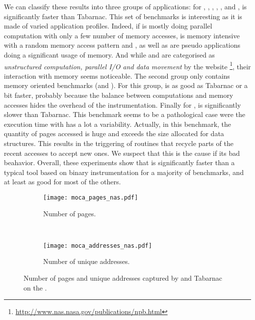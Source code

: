 We can classify these results into three groups of
applications:  for \BT, \DC, \EP, \IS, \LU, \SP and \UA, \Moca is
significantly faster than Tabarnac. This set of benchmarks is interesting as it is made of varied application profiles.
Indeed, if \EP is mostly doing parallel computation with only a few number of
memory accesses, \IS is memory intensive with a random memory access pattern and
\BT, \LU as well as \SP are pseudo applications doing a significant usage of memory.
And while \DC and \UA are categorised as \emph{unstructured computation,
parallel I/O and data movement} by the \NPB website
\footnote{\url{http://www.nas.nasa.gov/publications/npb.html}}, their interaction with memory seems noticeable.
The second group only contains memory oriented benchmarks (\CG and \FT). For this group,
\Moca is as good as Tabarnac or a bit faster, probably because the balance between computations and memory accesses hides the overhead of the instrumentation.
Finally for \MG, \Moca is
significantly slower than Tabarnac. This benchmark seems to be a pathological
case were the execution time with \Moca has a lot a variability. Actually, in this benchmark, the quantity of pages accessed is huge and exceeds the size
allocated for \Moca data structures. This results in the triggering of \Moca routines that recycle parts of the recent accesses to accept new ones.
We suspect that this is the cause if its bad beahavior.
Overall, these experiments show that \Moca is significantly faster than a typical tool based on binary instrumentation
for a majority of benchmarks, and at least as good for most of the others.

\begin{figure*}[htb]
    \centering
    \begin{subfigure}{.49\linewidth}
        \texttt{[image: moca\_pages\_nas.pdf]}
        \caption{Number of pages.}
        \label{fig:pages}
    \end{subfigure}
    ~
    \begin{subfigure}{.49\linewidth}
        \texttt{[image: moca\_addresses\_nas.pdf]}
        \caption{Number of unique addresses.}
        \label{fig:addr}
    \end{subfigure}
    \caption{Number of pages and unique addresses captured by \Moca and Tabarnac
    on the \NPB.}
    \label{fig:pages-addr}
\end{figure*}

